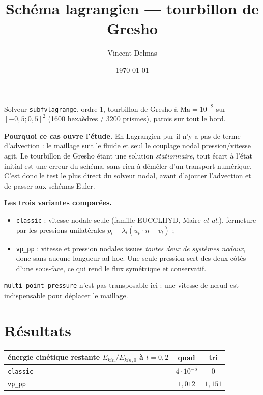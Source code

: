 \documentclass[11pt,a4paper]{article}
\title{Schéma lagrangien \texttt{\sch} --- tourbillon de Gresho}
\author{Vincent Delmas}
\date{\today}
\begin{document}
\maketitle

\noindent
Solveur \texttt{subfvlagrange}, ordre 1, tourbillon de Gresho à $\mathrm{Ma}=10^{-2}$
sur $[-0{,}5;0{,}5]^2$ (1600 hexaèdres / 3200 prismes), parois sur tout le bord.

\medskip
\noindent\textbf{Pourquoi ce cas ouvre l'étude.} En Lagrangien pur il n'y a pas de terme
d'advection : le maillage suit le fluide et seul le couplage nodal pression/vitesse
agit. Le tourbillon de Gresho étant une solution \emph{stationnaire}, tout écart à
l'état initial est une erreur du schéma, sans rien à démêler d'un transport numérique.
C'est donc le test le plus direct du solveur nodal, avant d'ajouter l'advection et de
passer aux schémas Euler.

\medskip
\noindent\textbf{Les trois variantes comparées.}
\begin{itemize}\itemsep2pt
  \item \texttt{classic} : vitesse nodale seule (famille EUCCLHYD, Maire \emph{et al.}), fermeture par
        les pressions unilatérales $p_l-\lambda_l(u_p\!\cdot\!n-v_l)$ ;
  \item \texttt{vp\_pp} : vitesse et pression nodales issues \emph{toutes deux de
        systèmes nodaux}, donc sans aucune longueur ad hoc. Une seule pression sert des
        deux côtés d'une sous-face, ce qui rend le flux symétrique et conservatif.
\end{itemize}

\noindent
\texttt{multi\_point\_pressure} n'est pas transposable ici : une vitesse de n\oe{}ud est
indispensable pour déplacer le maillage.

\section*{Résultats}

\begin{table}[H]\centering
\begin{tabular}{lcc}
\toprule
énergie cinétique restante $E_{kin}/E_{kin,0}$ à $t=0{,}2$ & quad & tri \\
\midrule
\texttt{classic}   & $4\cdot10^{-5}$ & $0$ \\
\texttt{vp\_pp} & $1{,}012$ & $1{,}151$ \\
\bottomrule
\end{tabular}
\end{table}
\end{document}
